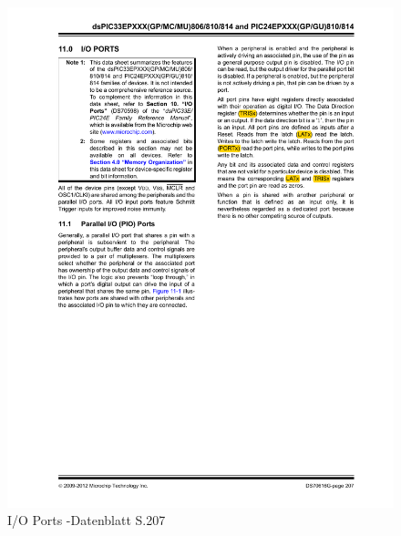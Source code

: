 \begin{figure}[!h]
	\centering
	\includegraphics[width=\textwidth]{Images/page207}
	\caption[I/O Ports]{I/O Ports -Datenblatt S.207}
	\label{image:page207}
\end{figure}

